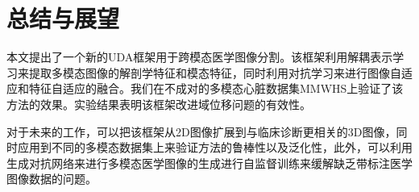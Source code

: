 \chapter{总结与展望}

\label{cha:conclusion}

本文提出了一个新的UDA框架用于跨模态医学图像分割。该框架利用解耦表示学习来提取多模态图像的解剖学特征和模态特征，同时利用对抗学习来进行图像自适应和特征自适应的融合。我们在不成对的多模态心脏数据集MMWHS上验证了该方法的效果。实验结果表明该框架改进域位移问题的有效性。

对于未来的工作，可以把该框架从2D图像扩展到与临床诊断更相关的3D图像，同时应用到不同的多模态数据集上来验证方法的鲁棒性以及泛化性，此外，可以利用生成对抗网络来进行多模态医学图像的生成进行自监督训练来缓解缺乏带标注医学图像数据的问题。
